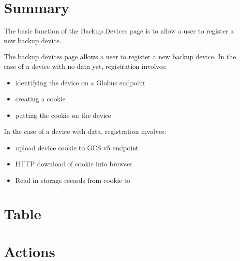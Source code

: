 
\section{Summary}

The basic function of the Backup Devices page is to allow a user to register a new backup device.


\noindent The backup devices page allows a user to register a new backup device.
In the case of a device with no data yet, registration involves:
\begin{itemize}
    \item identifying the device on a Globus endpoint
    \item creating a cookie
    \item putting the cookie on the device
\end{itemize}

\noindent In the case of a device with data, registration involves:
\begin{itemize}
    \item upload device cookie to GCS v5 endpoint
    \item HTTP download of cookie into browser
    \item Read in storage records from cookie to 
\end{itemize}

\section{Table}
\section{Actions}
